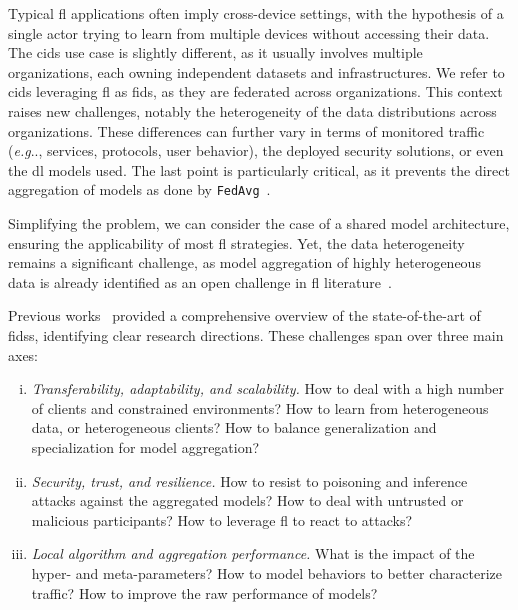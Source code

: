 \documentclass[conference]{IEEEtran}
\makeatletter
\DeclareRobustCommand\onedot{\futurelet\@let@token\@onedot}
\def\@onedot{\ifx\@topicslet@token.\else.\null\fi\xspace}
\def\eg{\emph{e.g}\onedot} \def\Eg{\emph{E.g}\onedot}
\makeatother
\begin{document}
Typical \gls{fl} applications often imply cross-device settings, with the hypothesis of a single actor trying to learn from multiple devices without accessing their data.
The \gls{cids} use case is slightly different, as it usually involves multiple organizations, each owning independent datasets and infrastructures.
We refer to \gls{cids} leveraging \gls{fl} as \gls{fids}, as they are federated across organizations.
%
This context raises new challenges, notably the heterogeneity of the data distributions across organizations.
These differences can further vary in terms of monitored traffic (\eg, services, protocols, user behavior), the deployed security solutions, or even the \gls{dl} models used.
The last point is particularly critical, as it prevents the direct aggregation of models as done by \texttt{FedAvg}~\cite{mcmahan_communication-efficient_2017}.

Simplifying the problem, we can consider the case of a shared model architecture, ensuring the applicability of most \gls{fl} strategies.
Yet, the data heterogeneity remains a significant challenge, as model aggregation of highly heterogeneous data is already identified as an open challenge in \gls{fl} literature~\cite{zhu_federated_2021}.

Previous works~\cite{lavaur_evolution_2022} provided a comprehensive overview of the state-of-the-art of \glspl{fids}, identifying clear research directions.
These challenges span over three main axes:

\begin{enumerate}[(i)]
    \item \emph{Transferability, adaptability, and scalability.}
    How to deal with a high number of clients and constrained environments?
    How to learn from heterogeneous data, or heterogeneous clients?
    How to balance generalization and specialization for model aggregation?

    \item \emph{Security, trust, and resilience.}
    How to resist to poisoning and inference attacks against the aggregated models?
    How to deal with untrusted or malicious participants?
    How to leverage \gls{fl} to react to attacks?

    \item \emph{Local algorithm and aggregation performance.}
    What is the impact of the hyper- and meta-parameters?
    How to model behaviors to better characterize traffic?
    How to improve the raw performance of models?
\end{enumerate}
\end{document}
